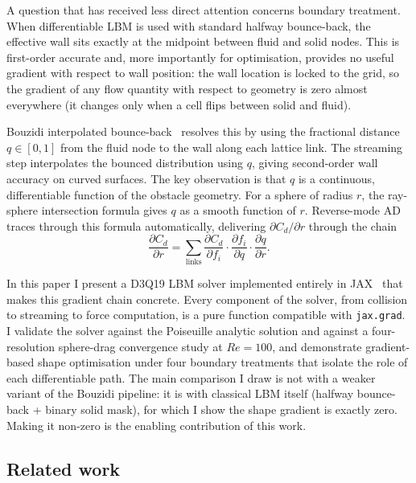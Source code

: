 \documentclass[10pt,twocolumn]{article}
\begin{document}
A question that has received less direct attention concerns boundary
treatment. When differentiable LBM is used with standard halfway
bounce-back, the effective wall sits exactly at the midpoint between
fluid and solid nodes. This is first-order accurate and, more
importantly for optimisation, provides no useful gradient with respect
to wall position: the wall location is locked to the grid, so the
gradient of any flow quantity with respect to geometry is zero almost
everywhere (it changes only when a cell flips between solid and
fluid).

Bouzidi interpolated bounce-back~\cite{bouzidi2001} resolves this by
using the fractional distance $q \in [0, 1]$ from the fluid node to the
wall along each lattice link. The streaming step interpolates the bounced
distribution using $q$, giving second-order wall accuracy on curved
surfaces. The key observation is that $q$ is a continuous, differentiable
function of the obstacle geometry. For a sphere of radius $r$, the
ray-sphere intersection formula gives $q$ as a smooth function of $r$.
Reverse-mode AD traces through this formula automatically, delivering
$\partial C_d / \partial r$ through the chain
%
\begin{equation}
\frac{\partial C_d}{\partial r}
= \sum_{\text{links}} \frac{\partial C_d}{\partial f_i}
  \cdot \frac{\partial f_i}{\partial q}
  \cdot \frac{\partial q}{\partial r}.
\label{eq:chain}
\end{equation}

In this paper I present a D3Q19 LBM solver implemented entirely in
JAX~\cite{jax2018} that makes this gradient chain concrete. Every
component of the solver, from collision to streaming to force
computation, is a pure function compatible with \texttt{jax.grad}. I
validate the solver against the Poiseuille analytic solution and
against a four-resolution sphere-drag convergence study at $Re =
100$, and demonstrate gradient-based shape optimisation under four
boundary treatments that isolate the role of each differentiable
path. The main comparison I draw is not with a weaker variant of
the Bouzidi pipeline: it is with classical LBM itself (halfway
bounce-back + binary solid mask), for which I show the shape
gradient is exactly zero. Making it non-zero is the enabling
contribution of this work.

\subsection{Related work}
\label{sec:related}
\end{document}
